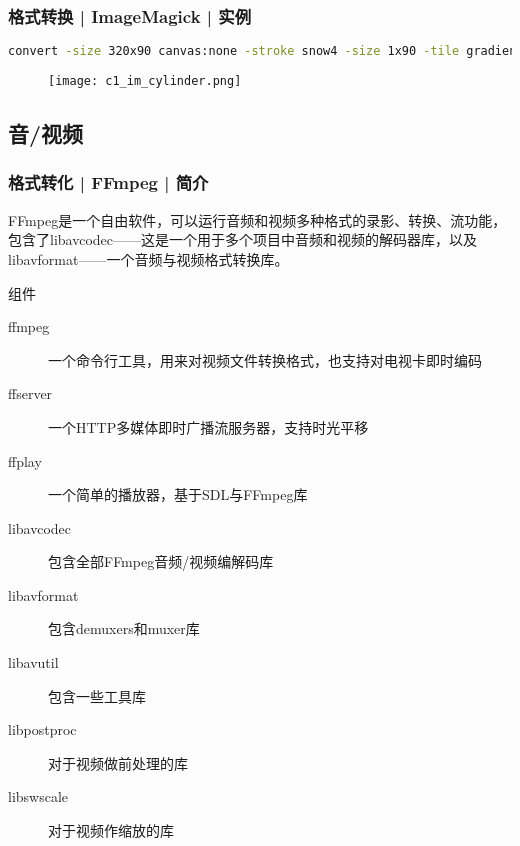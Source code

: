 \begin{frame}[fragile]
  \frametitle{格式转换 | ImageMagick | 实例}
\begin{lstlisting}[language=bash,basicstyle=\tiny\tt]
convert -size 320x90 canvas:none -stroke snow4 -size 1x90 -tile gradient:white-snow4 -draw 'roundrectangle 16, 5, 304, 85 20,40' +tile -fill snow -draw 'roundrectangle 264, 5, 304, 85  20,40' -tile gradient:chartreuse-green -draw 'roundrectangle 16, 5, 180, 85  20,40' -tile gradient:chartreuse1-chartreuse3 -draw 'roundrectangle 140, 5, 180, 85  20,40' +tile -fill none -draw 'roundrectangle 264, 5, 304, 85 20,40' -strokewidth 2 -draw 'roundrectangle 16, 5, 304, 85 20,40' \( +clone -background snow4 -shadow 80x3+3+3 \) +swap -background none -layers merge \( +size -font Helvetica -pointsize 90 -strokewidth 1 -fill red label:'50 %' -trim +repage \( +clone -background firebrick3 -shadow 80x3+3+3 \) +swap -background none -layers merge \) -insert 0 -gravity center -append -background white -gravity center -extent 320x200 cylinder_shaded.png
\end{lstlisting}
\begin{figure}
  \centering
  \texttt{[image: c1\_im\_cylinder.png]}
\end{figure}
\end{frame}

\subsection{音/视频}
\begin{frame}
  \frametitle{格式转化 | FFmpeg | 简介}
FFmpeg是一个自由软件，可以运行音频和视频多种格式的录影、转换、流功能，包含了libavcodec——这是一个用于多个项目中音频和视频的解码器库，以及libavformat——一个音频与视频格式转换库。
\begin{block}{组件}
  \begin{description}
    \item[ffmpeg]一个命令行工具，用来\alert{对视频文件转换格式}，也支持对电视卡即时编码
    \item[ffserver]一个HTTP多媒体即时广播流服务器，支持时光平移
    \item[ffplay]一个简单的播放器，基于SDL与FFmpeg库
    \item[libavcodec]包含全部FFmpeg音频/视频编解码库
    \item[libavformat]包含demuxers和muxer库
    \item[libavutil]包含一些工具库
    \item[libpostproc]对于视频做前处理的库
    \item[libswscale]对于视频作缩放的库
  \end{description}
\end{block}
\end{frame}

